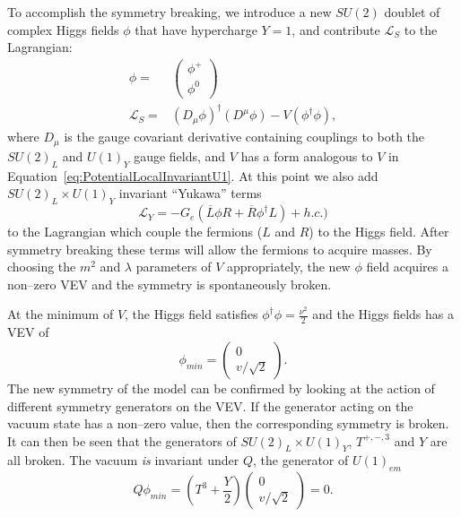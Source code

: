 To accomplish the symmetry breaking, we introduce a new $SU(2)$ doublet of
complex Higgs fields $\phi$ that have hypercharge $Y = 1$, and contribute
$\mathcal{L}_S$ to the Lagrangian:
\begin{eqnarray}
  \phi =& \left(\begin{array}{c}\phi^+ \\ \phi^0\end{array}\right) \\
  \mathcal{L}_S =& (D_\mu \phi)^\dag(D^\mu \phi) - V(\phi^\dag\phi),
\end{eqnarray}
where $D_\mu$ is the gauge covariant derivative containing couplings to both the
$SU(2)_L$ and $U(1)_Y$ gauge fields, and $V$ has a form analogous to $V$ in
Equation~\ref{eq:PotentialLocalInvariantU1}.  At this point we also add $SU(2)_L
\times U(1)_Y$ invariant ``Yukawa'' terms 
\begin{equation}
  \mathcal{L}_Y = -G_e(\overline L \phi R + \overline R \phi^\dag L) + h.c.)
  \label{eq:YukawaTerms}
\end{equation}
to the Lagrangian which couple the fermions ($L$ and $R$) to the Higgs field.
After symmetry breaking these terms will allow the fermions to acquire masses.
By choosing the $m^2$ and $\lambda$ parameters of $V$ appropriately, the new
$\phi$ field acquires a non--zero VEV and the symmetry is spontaneously broken.

At the minimum of $V$, the Higgs field satisfies $\phi^\dag\phi =
\frac{\nu^2}{2}$ and the Higgs fields has a VEV of
\begin{equation}
  \phi_{min} = \left(\begin{array}{c} 0 \\ v/\sqrt{2} \end{array}\right).
\end{equation}
The new symmetry of the model can be confirmed by looking at the action of
different symmetry generators on the VEV\@.  If the generator acting on the
vacuum state has a non--zero value, then the corresponding symmetry is broken.
It can then be seen that the generators of $SU(2)_L \times U(1)_Y$, $T^{+,-,3}$
and $Y$ are all broken.  The vacuum \emph{is} invariant under $Q$, the generator
of $U(1)_{em}$
\begin{equation}
  Q\phi_{min} = (T^3 + \frac{Y}{2})\left(\begin{array}{c} 0 \\ v/\sqrt{2}
  \end{array}\right) = 0 \nonumber.
\end{equation}

